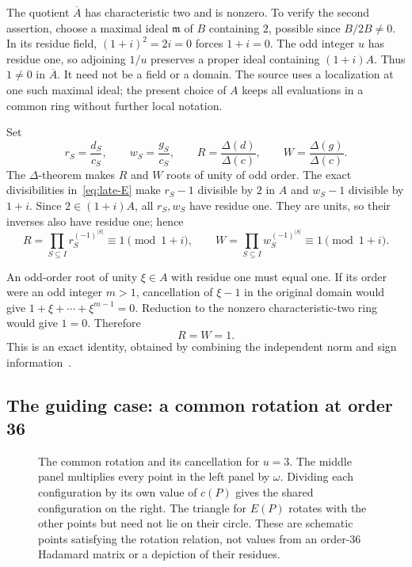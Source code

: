 \documentclass[11pt]{article}
\begin{document}
The quotient $\overline A$ has characteristic two and is nonzero.
To verify the second assertion, choose a maximal ideal $\mathfrak m$
of $B$ containing $2$, possible since $B/2B\ne0$. In its residue field,
${(1+i)}^{2}=2i=0$ forces $1+i=0$. The odd integer $u$ has residue one,
so adjoining $1/u$ preserves a proper ideal containing $(1+i)A$.
Thus $1\ne0$ in $\overline A$. It need not be a field or a domain.
The source uses a localization at one such maximal ideal; the present
choice of $A$ keeps all evaluations in a common ring without further
local notation.

Set
\[
 r_{S}=\frac{d_{S}}{c_{S}},\qquad w_{S}=\frac{g_{S}}{c_{S}},\qquad
 R=\frac{\Delta(d)}{\Delta(c)},\qquad W=\frac{\Delta(g)}{\Delta(c)}.
\]
The $\Delta$-theorem makes $R$ and $W$ roots of unity of odd order.
The exact divisibilities in~\eqref{eq:late-E} make
$r_{S}-1$ divisible by $2$ in $A$ and $w_{S}-1$ divisible by $1+i$.
Since $2\in(1+i)A$, all $r_{S},w_{S}$ have residue one. They are units,
so their inverses also have residue one; hence
\[
 R=\prod_{S\subseteq I}r_{S}^{{(-1)}^{|S|}}\equiv1\pmod{1+i},
 \qquad
 W=\prod_{S\subseteq I}w_{S}^{{(-1)}^{|S|}}\equiv1\pmod{1+i}.
\]

An odd-order root of unity $\xi\in A$ with residue one must equal one.
If its order were an odd integer $m>1$, cancellation of $\xi-1$ in
the original domain would give $1+\xi+\cdots+\xi^{m-1}=0$.
Reduction to the nonzero characteristic-two ring would give $1=0$.
Therefore
\begin{equation}
 R=W=1.%
 \label{eq:late-rigidity}
\end{equation}
This is an exact identity, obtained by combining the independent norm
and sign information~\cite[Eq.~(4.10)]{circulant-source}.

\subsection{The guiding case: a common rotation at order 36}

\begin{figure}[htbp]
 \centering
 
 \caption{The common rotation and its cancellation for $u=3$.
 The middle panel multiplies every point in the left panel by $\omega$.
 Dividing each configuration by its own value of $c(P)$ gives the shared
 configuration on the right. The triangle for $E(P)$ rotates with the
 other points but need not lie on their circle. These are schematic
 points satisfying the rotation relation, not values from an order-36
 Hadamard matrix or a depiction of their residues.}%
 \label{fig:common-rotation}
\end{figure}
\end{document}
